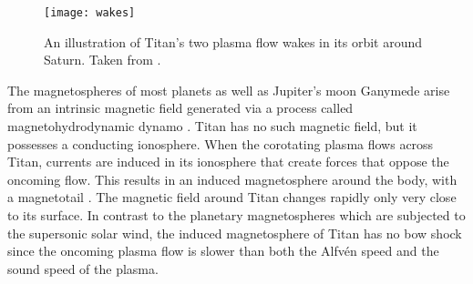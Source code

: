 \documentclass[12pt, parskip=full*, abstract]{scrartcl}
\begin{document}
\begin{figure}[htbp]
	\centering
	\texttt{[image: wakes]}
	\caption{An illustration of Titan's two plasma flow wakes in its orbit around Saturn. Taken from \textcite{ionosphere-magnetosphere-interaction-coates}.}
	\label{wakes}
\end{figure}

The magnetospheres of most planets as well as Jupiter's moon Ganymede arise from an intrinsic magnetic field generated via a process called magnetohydrodynamic dynamo \parencite{encyclopedia-magnetospheres}. Titan has no such magnetic field, but it possesses a conducting ionosphere. When the corotating plasma flows across Titan, currents are induced in its ionosphere that create forces that oppose the oncoming flow. This results in an induced magnetosphere around the body, with a magnetotail . The magnetic field around Titan changes rapidly only very close to its surface. In contrast to the planetary magnetospheres which are subjected to the supersonic solar wind, the induced magnetosphere of Titan has no bow shock since the oncoming plasma flow is slower than both the Alfvén speed and the sound speed of the plasma. 



\end{document}
